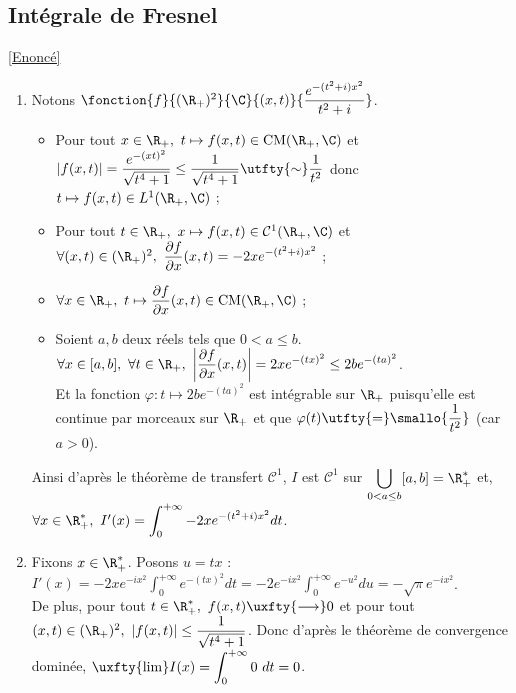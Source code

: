 \documentclass{book}
\begin{document}
	\subsection{Intégrale de Fresnel }
	\label{Intégrale de Fresnel corrigé}
	\textcolor{blue}{\hyperref[fresnel]{[Enoncé]}}\\
	\begin{enumerate}
		\item Notons $\fonction{f}{(\R_+)^2}{\C}{(x,t)}{\displaystyle\frac{e^{-(t^2+i)x^2}}{t^2+i}}$.
		\begin{itemize}
			\item Pour tout $x\in \R_+,\ t\mapsto f(x,t)\in \text{CM}(\R_+,\C)$ et $|f(x,t)|=\displaystyle\frac{e^{-(xt)^2}}{\sqrt{t^4+1}}\leq\frac{1}{\sqrt{t^4+1}}\utfty{\sim}\frac{1}{t^2}$ donc $t\mapsto f(x,t)\in L^1(\R_+,\C)$ ;
			\item Pour tout $t\in \R_+,\ x\mapsto f(x,t)\in \mathcal C^1(\R_+,\C)$ et $\forall (x,t)\in (\R_+)^2,\ \displaystyle\frac{\partial f}{\partial x}(x,t)=-2xe^{-(t^2+i)x^2}$ ;
			\item $\forall x\in \R_+,\ t\mapsto\displaystyle\frac{\partial f}{\partial x}(x,t)\in \text{CM}(\R_+,\C)$ ;
			\item Soient $a,b$ deux réels tels que $0<a\leq b$.\\
			$\forall x\in [a,b],\ \forall t\in \R_+,\ \displaystyle\left|\frac{\partial f}{\partial x}(x,t)\right|=2xe^{-(tx)^2}\leq2be^{-(ta)^2}$.\\
			Et la fonction $\varphi:t\mapsto2be^{-(ta)^2}$ est intégrable sur $\R_+$ puisqu'elle est continue par morceaux sur $\R_+$ et que $\varphi(t)\utfty{=}\smallo{\displaystyle\frac{1}{t^2}}$ (car $a>0$).
		\end{itemize}
		Ainsi d'après le théorème de transfert $\mathcal C^1$, $I$ est $\mathcal C^1$ sur $\displaystyle\bigcup_{0<a\leq b}[a,b]=\R^*_+$ et, $\forall x\in \R^*_+,\ I'(x)=\displaystyle\int_0^{+\infty}-2xe^{-(t^2+i)x^2}dt$.
		\item Fixons $x\in \R^*_+$. Posons $u=tx$ :\\
		$I'(x)=\displaystyle-2xe^{-ix^2}\int_0^{+\infty}e^{-(tx)^2}dt=-2e^{-ix^2}\int_0^{+\infty}e^{-u^2}du=-\sqrt{\pi}e^{-ix^2}$.\\
		De plus, pour tout $t\in \R^*_+,\ f(x,t)\uxfty{\longrightarrow}0$ et pour tout $(x,t)\in (\R_+)^2,\ |f(x,t)|\leq \displaystyle\frac{1}{\sqrt{t^4+1}}$. Donc d'après le théorème de convergence dominée, $\uxfty{\lim}I(x)=\displaystyle\int_0^{+\infty}0\ dt=0$.\\

\end{enumerate}
\end{document}
